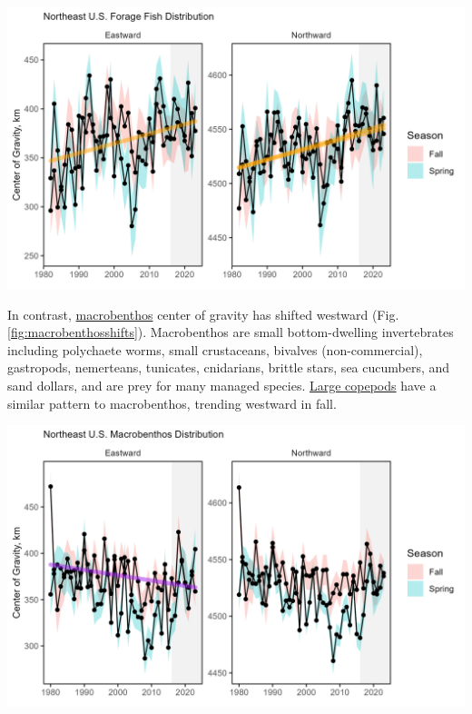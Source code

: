 \documentclass[
  10pt,
]{article}
\let\origfigure\figure
\let\endorigfigure\endfigure
\renewenvironment{figure}[1][2] {
    \expandafter\origfigure\expandafter[H]
} {
    \endorigfigure
}
\begin{document}
\begin{figure}

{\centering \includegraphics[width=6.5in]{images/BothReports/forage_dist_BothReports_2025-09-09} 

}

\caption{Eastward (left) and northward (right) shifts in the center of gravity for 20 forage fish species on the Northeast U.S. Shelf, with increasing trend (orange) for fall eastward and northward center of gravity.}\label{fig:forageshifts}
\end{figure}

In contrast, \href{https://noaa-edab.github.io/catalog/benthos_index.html}{macrobenthos} center of gravity has shifted westward (Fig. \ref{fig:macrobenthosshifts}). Macrobenthos are small bottom-dwelling invertebrates including polychaete worms, small crustaceans, bivalves (non-commercial), gastropods, nemerteans, tunicates, cnidarians, brittle stars, sea cucumbers, and sand dollars, and are prey for many managed species. \href{https://noaa-edab.github.io/catalog/zooplankton_index.html\#key-results-and-visualizations-4}{Large copepods} have a similar pattern to macrobenthos, trending westward in fall.

\begin{figure}

{\centering \includegraphics[width=6.5in]{images/BothReports/macrobenthos_dist_BothReports_2025-09-09} 

}

\caption{Eastward (left) and northward (right) shifts in the center of gravity for macrobenthos species on the Northeast U.S. Shelf}\label{fig:macrobenthosshifts}
\end{figure}
\end{document}
